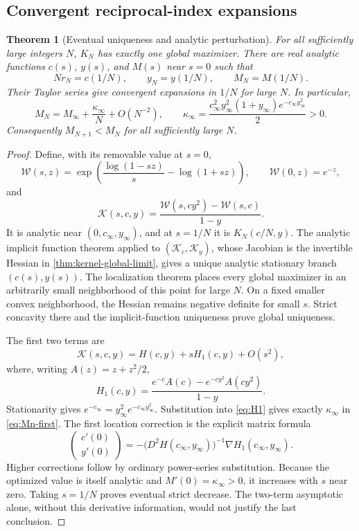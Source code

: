 \documentclass[11pt]{article}
\numberwithin{equation}{section}
\newtheorem{theorem}{Theorem}[section]
\theoremstyle{definition}
\theoremstyle{remark}
\begin{document}
\subsection{Convergent reciprocal-index expansions}

\begin{theorem}[Eventual uniqueness and analytic perturbation]
\label{thm:kernel-expansion}
For all sufficiently large integers $N$, $K_N$ has exactly one
global maximizer. There are real analytic functions $c(s)$, $y(s)$,
and $M(s)$ near $s=0$ such that
\[
 Nr_N=c(1/N),\qquad y_N=y(1/N),\qquad M_N=M(1/N).
\]
Their Taylor series give convergent expansions in $1/N$ for large $N$.
In particular,
\begin{equation}\label{eq:Mn-first}
 M_N=M_\infty+\frac{\kappa_\infty}{N}+O(N^{-2}),\qquad
 \kappa_\infty=
 \frac{c_\infty^2y_\infty^2(1+y_\infty)
       e^{-c_\infty y_\infty^2}}2>0.
\end{equation}
Consequently $M_{N+1}<M_N$ for all sufficiently large $N$.
\end{theorem}
\begin{proof}
Define, with its removable value at $s=0$,
\[
 \mathcal W(s,z)=\exp\left(\frac{\log(1-sz)}s-\log(1+sz)\right),
 \qquad \mathcal W(0,z)=e^{-z},
\]
and
\[
 \mathcal K(s,c,y)=
 \frac{\mathcal W(s,cy^2)-\mathcal W(s,c)}{1-y}.
\]
It is analytic near $(0,c_\infty,y_\infty)$, and at $s=1/N$
it is $K_N(c/N,y)$. The analytic implicit function theorem applied
to $(\mathcal K_c,\mathcal K_y)$, whose Jacobian is the invertible
Hessian in \cref{thm:kernel-global-limit}, gives a unique analytic
stationary branch $(c(s),y(s))$. The localization theorem places
every global maximizer in an arbitrarily small neighborhood of this
point for large $N$. On a fixed smaller convex neighborhood, the Hessian
remains negative definite for small $s$. Strict concavity there and
the implicit-function uniqueness prove global uniqueness.

The first two terms are
\[
 \mathcal K(s,c,y)=H(c,y)+sH_1(c,y)+O(s^2),
\]
where, writing $A(z)=z+z^2/2$,
\begin{equation}\label{eq:H1}
 H_1(c,y)=\frac{e^{-c}A(c)-e^{-cy^2}A(cy^2)}{1-y}.
\end{equation}
Stationarity gives $e^{-c_\infty}=y_\infty^2e^{-c_\infty y_\infty^2}$.
Substitution into \eqref{eq:H1} gives exactly $\kappa_\infty$ in
\eqref{eq:Mn-first}. The first location correction is the explicit
matrix formula
\begin{equation}\label{eq:kernel-drift}
 \begin{pmatrix}c'(0)\\y'(0)\end{pmatrix}
 =-\bigl(D^2H(c_\infty,y_\infty)\bigr)^{-1}
        \nabla H_1(c_\infty,y_\infty).
\end{equation}
Higher corrections follow by ordinary power-series substitution.
Because the optimized value is itself analytic and
$M'(0)=\kappa_\infty>0$, it increases with $s$ near zero.
Taking $s=1/N$ proves eventual strict decrease. The two-term
asymptotic alone, without this derivative information, would not
justify the last conclusion.
\end{proof}
\end{document}
